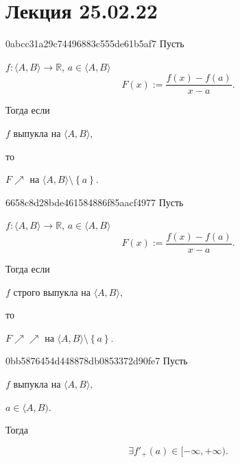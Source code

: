 \section{Лекция 25.02.22}
\begin{note}{0abcc31a29c74496883c555de61b5af7}
    Пусть \begin{icloze}{3}\( f : \langle A, B \rangle \to \mathbb R \), \( a \in \langle A, B \rangle  \)
    \[
        F(x) := \frac{f(x) - f(a)}{x - a}.
    \]\end{icloze}

    Тогда если \begin{icloze}{2}\( f \) выпукла на \( \langle A, B \rangle  \),\end{icloze} то
    \begin{icloze}{1}
        \begin{center}
            \( F \!\!\nearrow \) на \( \langle A, B \rangle \setminus \left\{ a \right\} \).
        \end{center}
    \end{icloze}
\end{note}

\begin{note}{6658c8d28bde461584886f85aacf4977}
    Пусть \begin{icloze}{3}\( f : \langle A, B \rangle \to \mathbb R \), \( a \in \langle A, B \rangle  \)
    \[
        F(x) := \frac{f(x) - f(a)}{x - a}.
    \]\end{icloze}

    Тогда если \begin{icloze}{2}\( f \) строго выпукла на \( \langle A, B \rangle  \),\end{icloze} то
    \begin{icloze}{1}
        \begin{center}
            \( F \!\!\nearrow\!\nearrow  \) на \( \langle A, B \rangle \setminus \left\{ a \right\} \).
        \end{center}
    \end{icloze}
\end{note}

\begin{note}{0bb5876454d448878db0853372d90fe7}
    Пусть \begin{icloze}{3}\( f \) выпукла на \( \langle A, B \rangle  \),\end{icloze} \begin{icloze}{2}\( a \in \langle A, B )  \).\end{icloze} Тогда
    \begin{icloze}{1}
        \[
            \exists f'_+(a) \in [-\infty, +\infty ).
        \]
    \end{icloze}
\end{note}

